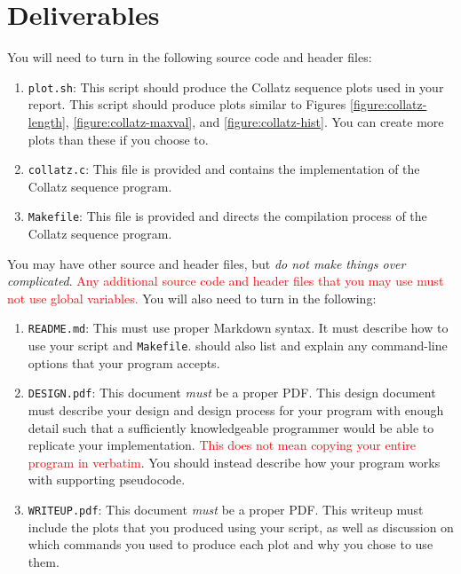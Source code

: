\section{Deliverables}

You will need to turn in the following source code and header files:

\begin{enumerate}
  \item \texttt{plot.sh}: This \Bash{} script should produce the Collatz
    sequence plots used in your report. This script should produce plots similar
    to Figures \ref{figure:collatz-length}, \ref{figure:collatz-maxval}, and
    \ref{figure:collatz-hist}. You can create more plots than these if you
    choose to.
  \item \texttt{collatz.c}: This file is provided and contains the
    implementation of the Collatz sequence program.
  \item \texttt{Makefile}: This file is provided and directs the compilation
    process of the Collatz sequence program.
\end{enumerate}

You may have other source and header files, but \emph{do not make things
over complicated}. \textcolor{red}{Any additional source code and header
files that you may use must not use global variables.}
You will also need to turn in the following:

\begin{enumerate}
  \item \texttt{README.md}: This must use proper Markdown syntax. It
    must describe how to use your script and \texttt{Makefile}.
    should also list and explain any command-line options that your
    program accepts.
  \item \texttt{DESIGN.pdf}: This document \emph{must} be a proper PDF\@. This
    design document must describe your design and design process for your
    program with enough detail such that a sufficiently knowledgeable programmer
    would be able to replicate your implementation. \textcolor{red}{This does
    not mean copying your entire program in verbatim}. You should instead
    describe how your program works with supporting pseudocode.
  \item \texttt{WRITEUP.pdf}: This document \emph{must} be a proper
    PDF\@. This writeup must include the plots that you produced using your
    \Bash{} script, as well as discussion on which \Unix{} commands you
    used to produce each plot and why you chose to use them.
\end{enumerate}

